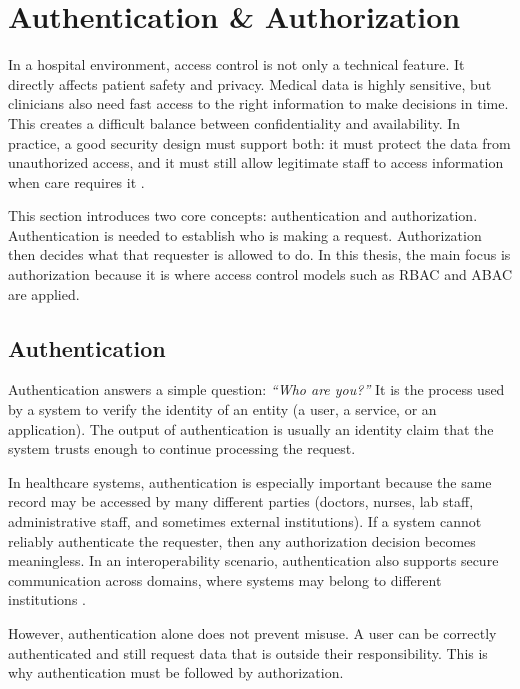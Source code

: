 \section{Authentication \& Authorization}
\label{sec:auth-authz}

In a hospital environment, access control is not only a technical feature. It directly affects patient safety and privacy. Medical data is highly sensitive, but clinicians also need fast access to the right information to make decisions in time. This creates a difficult balance between confidentiality and availability. In practice, a good security design must support both: it must protect the data from unauthorized access, and it must still allow legitimate staff to access information when care requires it \cite{Shin2015, SantosPereira2013}.
\vspace{0.5cm}


This section introduces two core concepts: authentication and authorization. Authentication is needed to establish who is making a request. Authorization then decides what that requester is allowed to do. In this thesis, the main focus is authorization because it is where access control models such as RBAC and ABAC are applied.



\subsection{Authentication}
\label{subsec:authentication}

Authentication answers a simple question: \textit{“Who are you?”} It is the process used by a system to verify the identity of an entity (a user, a service, or an application). The output of authentication is usually an identity claim that the system trusts enough to continue processing the request.
\vspace{0.5cm}


In healthcare systems, authentication is especially important because the same record may be accessed by many different parties (doctors, nurses, lab staff, administrative staff, and sometimes external institutions). If a system cannot reliably authenticate the requester, then any authorization decision becomes meaningless. In an interoperability scenario, authentication also supports secure communication across domains, where systems may belong to different institutions \cite{SantosPereira2013}.
\vspace{0.5cm}


However, authentication alone does not prevent misuse. A user can be correctly authenticated and still request data that is outside their responsibility. This is why authentication must be followed by authorization.

